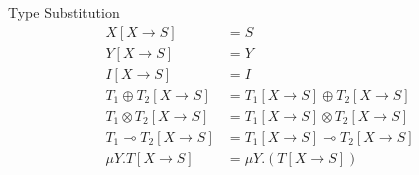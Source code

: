 \documentclass[8pt]{jsarticle}
\begin{document}
\begin{itembox}[c]{Type Substitution}
  \begin{align*}
    X[X \rightarrow S]                   &= S \\
    Y[X \rightarrow S]                   &= Y \\
    I[X \rightarrow S]                   &= I \\
    T_1\oplus{}T_2[X \rightarrow S]      &= T_1[X \rightarrow S]\oplus{}T_2[X \rightarrow S] \\
    T_1\otimes{}T_2[X \rightarrow S]     &= T_1[X \rightarrow S]\otimes{}T_2[X \rightarrow S] \\
    T_1\multimap{}T_2[X \rightarrow S]   &= T_1[X \rightarrow S]\multimap{}T_2[X \rightarrow S] \\
    \mu{Y}.T[X \rightarrow S]            &= \mu{Y}.(T[X \rightarrow S]) \\
  \end{align*}
\end{itembox}
\end{document}
